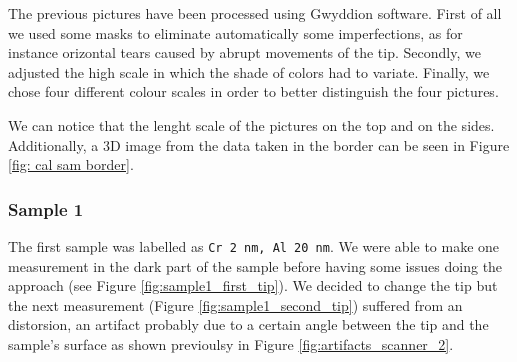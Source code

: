 \documentclass[11pt,a4paper]{article}
\begin{document}
The previous pictures have been processed using Gwyddion software. First of all we used some masks to eliminate automatically some imperfections, as for instance orizontal tears caused by abrupt movements of the tip. Secondly, we adjusted the high scale in which the shade of colors had to variate. Finally, we chose four different colour scales in order to better distinguish the four pictures.

We can notice that the lenght scale of the pictures on the top and on the sides. Additionally, a 3D image from the data taken in the border can be seen in Figure \ref{fig: cal sam border}.

\subsubsection{Sample 1}
The first sample was labelled as \texttt{Cr \SI{2}{\nano m}, Al \SI{20}{\nano m}}. We were able to make one measurement in the dark part of the sample before having some issues doing the approach (see Figure \ref{fig:sample1_first_tip}). We decided to change the tip but the next measurement (Figure \ref{fig:sample1_second_tip}) suffered from an distorsion, an artifact probably due to a certain angle between the tip and the sample's surface as shown previoulsy in Figure \ref{fig:artifacts_scanner_2}.
\end{document}
